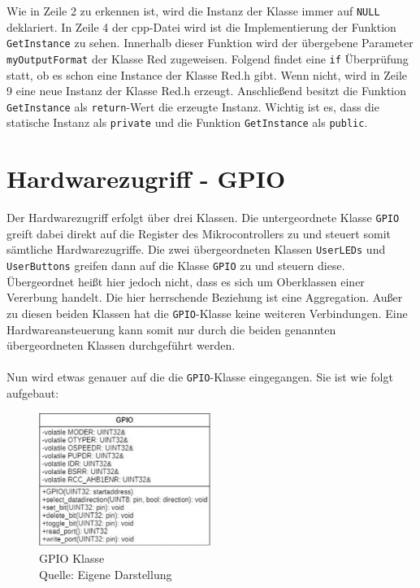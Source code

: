 Wie in Zeile 2 zu erkennen ist, wird die Instanz der Klasse immer auf \texttt{NULL} deklariert. In Zeile 4 der cpp-Datei wird ist die Implementierung der Funktion \texttt{GetInstance} zu sehen. Innerhalb dieser Funktion wird der übergebene Parameter \texttt{myOutputFormat} der Klasse Red zugeweisen. Folgend findet eine \texttt{if} Überprüfung statt, ob es schon eine Instance der Klasse Red.h gibt. Wenn nicht, wird in Zeile 9 eine neue Instanz der Klasse Red.h erzeugt. Anschließend besitzt die Funktion \texttt{GetInstance} als \texttt{return}-Wert die erzeugte Instanz. Wichtig ist es, dass die statische Instanz als \texttt{private} und die Funktion \texttt{GetInstance} als \texttt{public}.

\chapter{Hardwarezugriff - GPIO}
Der Hardwarezugriff erfolgt über drei Klassen. Die untergeordnete Klasse \texttt{GPIO} greift dabei direkt auf die Register des Mikrocontrollers zu und steuert somit sämtliche Hardwarezugriffe. Die zwei übergeordneten Klassen \texttt{UserLEDs} und \texttt{UserButtons} greifen dann auf die Klasse \texttt{GPIO} zu und steuern diese. Übergeordnet heißt hier jedoch nicht, dass es sich um Oberklassen einer Vererbung handelt. Die hier herrschende Beziehung ist eine Aggregation. Außer zu diesen beiden Klassen hat die \texttt{GPIO}-Klasse keine weiteren Verbindungen. Eine Hardwareansteuerung kann somit nur durch die beiden genannten übergeordneten Klassen durchgeführt werden.\\
\\
Nun wird etwas genauer auf die die \texttt{GPIO}-Klasse eingegangen. Sie ist wie folgt aufgebaut:

\begin{figure}[H] 
	\centering
	\includegraphics[width=0.5\textwidth]{images/04.png}
	\caption{GPIO Klasse \protect \\ Quelle: Eigene Darstellung}
	\label{fig:grafik4}
\end{figure}

